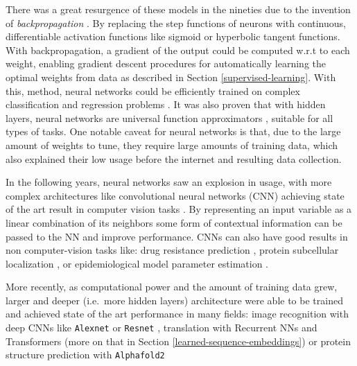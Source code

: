 \documentclass[
  11pt,
  twoside,
  BCOR=10mm,
  listof=totoc]{scrbook}
\begin{document}
There was a great resurgence of these models in the nineties due to the invention of \emph{backpropagation} \autocite{rumelhartLearningRepresentationsBackpropagating1986}. By replacing the step functions of neurons with continuous, differentiable activation functions like sigmoid or hyperbolic tangent functions. With backpropagation, a gradient of the output could be computed w.r.t to each weight, enabling gradient descent procedures for automatically learning the optimal weights from data as described in Section \ref{supervised-learning}. With this, method, neural networks could be efficiently trained on complex classification and regression problems \autocite{murtaghMultilayerPerceptronsClassification1991}. It was also proven that with hidden layers, neural networks are universal function approximators \autocite{cybenkoApproximationSuperpositionsSigmoidal1989,hornikMultilayerFeedforwardNetworks1989,hornikApproximationCapabilitiesMultilayer1991a}, suitable for all types of tasks. One notable caveat for neural networks is that, due to the large amount of weights to tune, they require large amounts of training data, which also explained their low usage before the internet and resulting data collection.

In the following years, neural networks saw an explosion in usage, with more complex architectures like convolutional neural networks (CNN) achieving state of the art result in computer vision tasks \autocite{lecunBackpropagationAppliedHandwritten1989,lecunGradientbasedLearningApplied1998}. By representing an input variable as a linear combination of its neighbors some form of contextual information can be passed to the NN and improve performance. CNNs can also have good results in non computer-vision tasks like: drug resistance prediction \autocite{steinerDrugResistancePrediction2020a}, protein subcellular localization \autocite{weiPredictionHumanProtein2018}, or epidemiological model parameter estimation \autocite{voznicaDeepLearningPhylogenies2022}.

More recently, as computational power and the amount of training data grew, larger and deeper (i.e.~more hidden layers) architecture were able to be trained and achieved state of the art performance in many fields: image recognition with deep CNNs like \texttt{Alexnet} \autocite{krizhevskyImageNetClassificationDeep2017} or \texttt{Resnet} \autocite{heDeepResidualLearning2016}, translation with Recurrent NNs \autocite{bahdanauNeuralMachineTranslation2016} and Transformers \autocite{vaswaniAttentionAllYou2017} (more on that in Section \ref{learned-sequence-embeddings}) or protein structure prediction with \texttt{Alphafold2} \autocite{jumperHighlyAccurateProtein2021}
\end{document}
